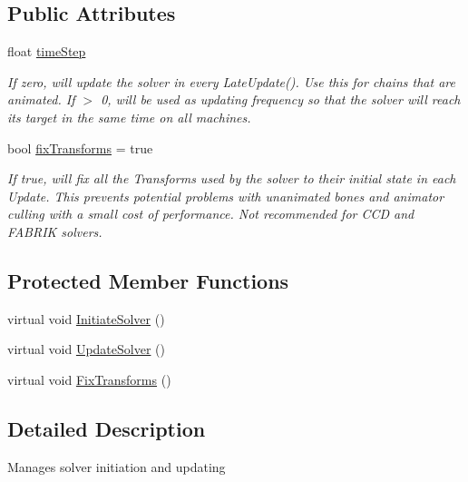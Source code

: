 \subsection*{Public Attributes}
\begin{DoxyCompactItemize}
\item 
float \mbox{\hyperlink{class_root_motion_1_1_solver_manager_a7fc2aab2764fc8e4da5cd714d887801d}{time\+Step}}
\begin{DoxyCompactList}\small\item\em If zero, will update the solver in every Late\+Update(). Use this for chains that are animated. If $>$ 0, will be used as updating frequency so that the solver will reach its target in the same time on all machines. \end{DoxyCompactList}\item 
bool \mbox{\hyperlink{class_root_motion_1_1_solver_manager_a59c1ad381bba471b13398f8090db6e1a}{fix\+Transforms}} = true
\begin{DoxyCompactList}\small\item\em If true, will fix all the Transforms used by the solver to their initial state in each Update. This prevents potential problems with unanimated bones and animator culling with a small cost of performance. Not recommended for C\+CD and F\+A\+B\+R\+IK solvers. \end{DoxyCompactList}\end{DoxyCompactItemize}
\subsection*{Protected Member Functions}
\begin{DoxyCompactItemize}
\item 
virtual void \mbox{\hyperlink{class_root_motion_1_1_solver_manager_abd2008369f3de95712d5748aa4ce6243}{Initiate\+Solver}} ()
\item 
virtual void \mbox{\hyperlink{class_root_motion_1_1_solver_manager_ac7a8239a700672570da89d88544a340d}{Update\+Solver}} ()
\item 
virtual void \mbox{\hyperlink{class_root_motion_1_1_solver_manager_addb54e92acd91364a9205c5807a42776}{Fix\+Transforms}} ()
\end{DoxyCompactItemize}


\subsection{Detailed Description}
Manages solver initiation and updating 




